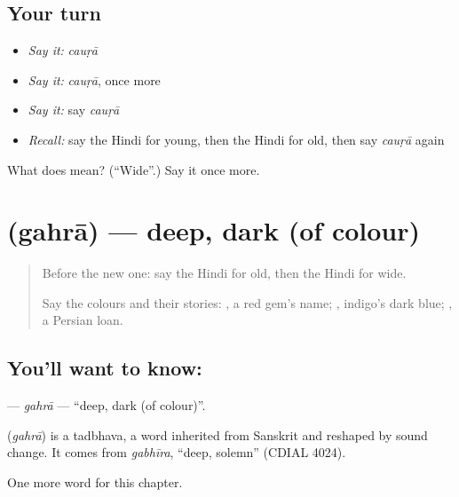 \subsection*{Your turn}
\begin{itemize}
\raggedright
  \item \emph{Say it:} \emph{cauṛā}
  \item \emph{Say it:} \emph{cauṛā}, once more
  \item \emph{Say it:} say \emph{cauṛā}
  \item \emph{Recall:} say the Hindi for young, then the Hindi for old, then say \emph{cauṛā} again
\end{itemize}

\begin{tcolorbox}[breakable,colback=teal!4,colframe=teal!35!black,title={Before you move on}]
What does  mean? (\textquotedblleft{}Wide\textquotedblright{}.) Say it once more.
\end{tcolorbox}
\section[\texorpdfstring{\hi{गहरा} (gahrā)}{गहरा (gahrā)}]{ (gahrā) — deep, dark (of colour)}

\label{lesson:HI-C158-gahra}



\begin{quote}
Before the new one: say the Hindi for old, then the Hindi for wide.

Say the colours and their stories: \textbf{}, a red gem's name; \textbf{}, indigo's dark blue; \textbf{}, a Persian loan.
\end{quote}

\subsection*{You'll want to know: }
\textbf{} — \emph{gahrā} — \textquotedblleft{}deep, dark (of colour)\textquotedblright{}.

\begin{cousinweb}
\textbf{} (\emph{gahrā}) is a tadbhava, a word inherited from Sanskrit and reshaped by sound change. It comes from \emph{gabhīra}, \textquotedblleft{}deep, solemn\textquotedblright{} (CDIAL 4024).
\end{cousinweb}

\begin{grammarlens}[title={What you've built}]
One more word for this chapter.
\end{grammarlens}

